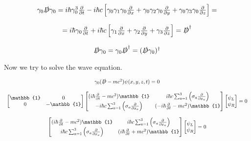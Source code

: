 \begin{equation}
  \begin{array}{c}
  \gamma_0\slashed{D}\gamma_0 = i\hbar \gamma_0^3\frac{\partial}{\partial t} - i\hbar c\left[\gamma_0\gamma_1\gamma_0 \frac{\partial}{\partial x}+\gamma_0\gamma_2\gamma_0 \frac{\partial}{\partial y}+\gamma_0\gamma_3\gamma_0 \frac{\partial}{\partial z}\right] =
  \\

  \\
  = i\hbar \gamma_0\frac{\partial}{\partial t} + i\hbar c\left[\gamma_1 \frac{\partial}{\partial x}+\gamma_2 \frac{\partial}{\partial y}+\gamma_3 \frac{\partial}{\partial z}\right] = \slashed{D}^\dagger
  \\

  \\
  \slashed{D}\gamma_0 = \gamma_0\slashed{D}^\dagger = (\slashed{D}\gamma_0)^\dagger
  \end{array}
\end{equation}

Now we try to solve the wave equation.

\begin{equation}
\begin{array}{c}
  \gamma_0(\slashed{D}-mc^2)\psi(x,y,z,t) = 0
  \\

  \\
  \begin{bmatrix}
    \mathbb{1} & 0\\
    0 & -\mathbb{1}
  \end{bmatrix}\begin{bmatrix}
    (i\hbar \frac{\partial }{\partial t} - mc^2)\mathbb{1} & i\hbar c\sum_{a=1}^{3}\left(\sigma_a\frac{\partial}{\partial x_a}\right)\\
    -i\hbar c\sum_{a=1}^{3}\left(\sigma_a\frac{\partial}{\partial x_a}\right) & (-i\hbar \frac{\partial }{\partial t} - mc^2)\mathbb{1}
  \end{bmatrix}
  \begin{bmatrix}
    \psi_L\\
    \psi_R\\
  \end{bmatrix} = 0
  \\

  \\
  \begin{bmatrix}
    (i\hbar \frac{\partial }{\partial t} - mc^2)\mathbb{1} & i\hbar c\sum_{a=1}^{3}\left(\sigma_a\frac{\partial}{\partial x_a}\right)\\
    i\hbar c\sum_{a=1}^{3}\left(\sigma_a\frac{\partial}{\partial x_a}\right) & (i\hbar \frac{\partial }{\partial t} + mc^2)\mathbb{1}
  \end{bmatrix}
  \begin{bmatrix}
    \psi_L\\
    \psi_R\\
  \end{bmatrix} = 0
\end{array}
\end{equation}

